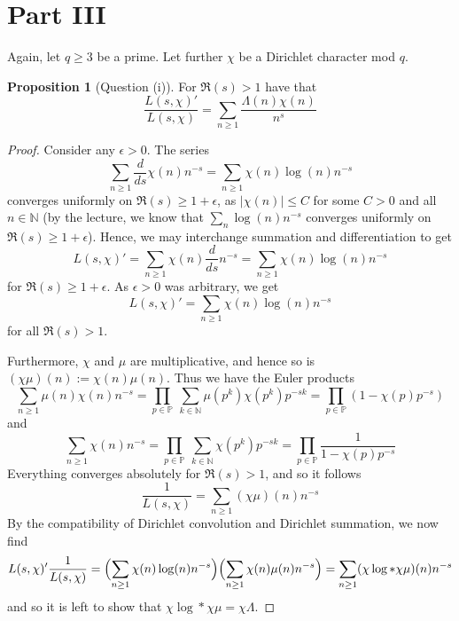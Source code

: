 \documentclass{scrartcl}
\newcommand{\primes}{\mathbb{P}}
\newcommand{\N}{\mathbb{N}}
\theoremstyle{definition}
\newtheorem{proposition}[definition]{Proposition}
\begin{document}
\section{Part III}
Again, let $q \geq 3$ be a prime.
Let further $\chi$ be a Dirichlet character mod $q$.
\begin{proposition}[Question (i)]
    \label{prop:logarithmic_derivative_L}
    For $\Re(s) > 1$ have that
    \begin{equation*}
        \frac {L(s, \chi)'} {L(s, \chi)} = \sum_{n \geq 1} \frac {\Lambda(n) \chi(n)} {n^s}
    \end{equation*}
\end{proposition}
\begin{proof}
    Consider any $\epsilon > 0$. The series
    \begin{equation*}
        \sum_{n \geq 1} \frac d {ds} \chi(n) n^{-s} = \sum_{n \geq 1} \chi(n) \log(n) n^{-s}
    \end{equation*}
    converges uniformly on $\Re(s) \geq 1 + \epsilon$, as $|\chi(n)| \leq C$ for some $C > 0$ and all $n \in \N$ (by the lecture, we know that $\sum_n \log(n) n^{-s}$ converges uniformly on $\Re(s) \geq 1 + \epsilon$).
    Hence, we may interchange summation and differentiation to get
    \begin{equation*}
        L(s, \chi)' = \sum_{n \geq 1} \chi(n) \frac d {ds} n^{-s} = \sum_{n \geq 1} \chi(n) \log(n) n^{-s}
    \end{equation*}
    for $\Re(s) \geq 1 + \epsilon$.
    As $\epsilon > 0$ was arbitrary, we get
    \begin{equation*}
        L(s, \chi)' = \sum_{n \geq 1} \chi(n) \log(n) n^{-s}
    \end{equation*}
    for all $\Re(s) > 1$.

    Furthermore, $\chi$ and $\mu$ are multiplicative, and hence so is $(\chi\mu)(n) := \chi(n)\mu(n)$.
    Thus we have the Euler products
    \begin{equation*}
        \sum_{n \geq 1} \mu(n) \chi(n) n^{-s} = \prod_{p \in \primes} \ \sum_{k \in \N} \mu(p^k) \chi(p^k) p^{-sk} = \prod_{p \in \primes} (1 - \chi(p)p^{-s})
    \end{equation*}
    and
    \begin{equation*}
        \sum_{n \geq 1} \chi(n) n^{-s} = \prod_{p \in \primes} \ \sum_{k \in \N} \chi(p^k) p^{-sk} = \prod_{p \in \primes} \frac 1 {1 - \chi(p)p^{-s}}
    \end{equation*}
    Everything converges absolutely for $\Re(s) > 1$, and so it follows
    \begin{equation*}
        \frac 1 {L(s, \chi)} = \sum_{n \geq 1} (\chi\mu)(n) n^{-s}
    \end{equation*}
    By the compatibility of Dirichlet convolution and Dirichlet summation, we now find
    \begin{equation*}
        L(s, \chi)' \frac 1 {L(s, \chi)} = \Bigl( \sum_{n \geq 1} \chi(n) \log(n) n^{-s} \Bigr) \Bigl( \sum_{n \geq 1} \chi(n) \mu(n) n^{-s} \Bigr) = \sum_{n \geq 1} (\chi\log * \chi\mu)(n) n^{-s}
    \end{equation*}
    and so it is left to show that $\chi\log * \chi\mu = \chi\Lambda$.


\end{proof}
\end{document}
